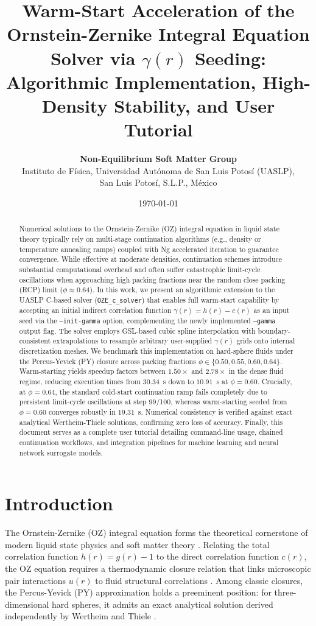 \documentclass[11pt,a4paper]{article}
\title{\textbf{Warm-Start Acceleration of the Ornstein-Zernike Integral Equation Solver via $\gamma(r)$ Seeding: Algorithmic Implementation, High-Density Stability, and User Tutorial}}
\author{
    \textbf{Non-Equilibrium Soft Matter Group} \\
    \small Instituto de F\'{i}sica, Universidad Aut\'{o}noma de San Luis Potos\'{i} (UASLP), \\
    \small San Luis Potos\'{i}, S.L.P., M\'{e}xico
}
\date{\today}
\begin{document}
\maketitle

\begin{abstract}
Numerical solutions to the Ornstein-Zernike (OZ) integral equation in liquid state theory typically rely on multi-stage continuation algorithms (e.g., density or temperature annealing ramps) coupled with Ng accelerated iteration to guarantee convergence. While effective at moderate densities, continuation schemes introduce substantial computational overhead and often suffer catastrophic limit-cycle oscillations when approaching high packing fractions near the random close packing (RCP) limit ($\phi \approx 0.64$). In this work, we present an algorithmic extension to the UASLP C-based solver (\texttt{OZE\_c\_solver}) that enables full warm-start capability by accepting an initial indirect correlation function $\gamma(r) = h(r) - c(r)$ as an input seed via the \texttt{--init-gamma} option, complementing the newly implemented \texttt{--gamma} output flag. The solver employs GSL-based cubic spline interpolation with boundary-consistent extrapolations to resample arbitrary user-supplied $\gamma(r)$ grids onto internal discretization meshes. We benchmark this implementation on hard-sphere fluids under the Percus-Yevick (PY) closure across packing fractions $\phi \in \{0.50, 0.55, 0.60, 0.64\}$. Warm-starting yields speedup factors between $1.50\times$ and $2.78\times$ in the dense fluid regime, reducing execution times from $30.34$~s down to $10.91$~s at $\phi=0.60$. Crucially, at $\phi=0.64$, the standard cold-start continuation ramp fails completely due to persistent limit-cycle oscillations at step 99/100, whereas warm-starting seeded from $\phi=0.60$ converges robustly in $19.31$~s. Numerical consistency is verified against exact analytical Wertheim-Thiele solutions, confirming zero loss of accuracy. Finally, this document serves as a complete user tutorial detailing command-line usage, chained continuation workflows, and integration pipelines for machine learning and neural network surrogate models.
\end{abstract}

\section{Introduction}

The Ornstein-Zernike (OZ) integral equation forms the theoretical cornerstone of modern liquid state physics and soft matter theory \cite{hansen2013theory}. Relating the total correlation function $h(r) = g(r) - 1$ to the direct correlation function $c(r)$, the OZ equation requires a thermodynamic closure relation that links microscopic pair interactions $u(r)$ to fluid structural correlations \cite{percus1958analysis}. Among classic closures, the Percus-Yevick (PY) approximation holds a preeminent position: for three-dimensional hard spheres, it admits an exact analytical solution derived independently by Wertheim \cite{wertheim1963exact} and Thiele \cite{thiele1963equation}.
\end{document}
